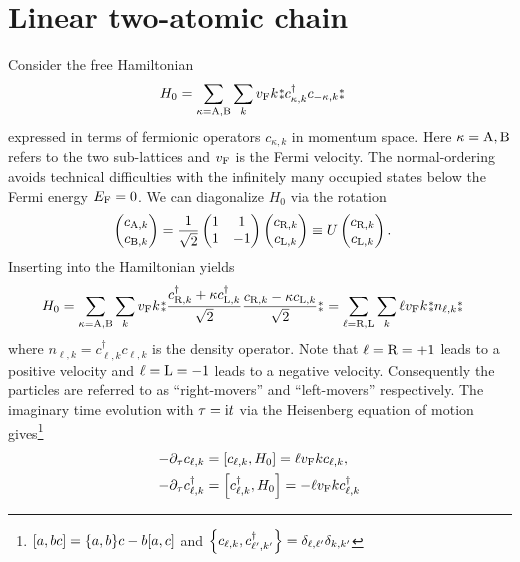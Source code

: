 \documentclass[english, parskip=full]{scrartcl}
\begin{document}
\section{Linear two-atomic chain}
Consider the free Hamiltonian
\begin{align}
H_0 &= \sum_{\kappa=\A,\B} \sum_k \vf k \varnormord{c_{\kappa,k}^\dagger c_{-\kappa,k}}
\end{align}
expressed in terms of fermionic operators $c_{\kappa,k}$ in momentum space.
Here $\kappa = \A,\B$ refers to the two sub-lattices and $\vf$ is the Fermi velocity.
The normal-ordering avoids technical difficulties with the infinitely many occupied states below the Fermi energy $E_\F=0$.
We can diagonalize $H_0$ via the rotation
\begin{align}
\begin{pmatrix}
c_{\A,k} \\ c_{\B,k}
\end{pmatrix} &= \frac{1}{\sqrt{2}} \begin{pmatrix}
1 & 1 \\ 1 & -1
\end{pmatrix} \begin{pmatrix}
c_{\R,k} \\ c_{\L,k}
\end{pmatrix} \equiv U \begin{pmatrix}
c_{\R,k} \\ c_{\L,k}
\end{pmatrix}.
\end{align}
Inserting into the Hamiltonian yields
\begin{align}
H_0 &= \sum_{\kappa=\A,\B} \sum_k \vf k \varnormord{\frac{c_{\R,k}^\dagger + \kappa c_{\L,k}^\dagger}{\sqrt{2}} \frac{c_{\R,k} - \kappa c_{\L,k}}{\sqrt{2}}} = \sum_{\ell=\R,\L} \sum_k \ell\vf k \varnormord{n_{\ell,k}}
\end{align}
where $n_{\ell,k} = c_{\ell,k}^\dagger c_{\ell,k}$ is the density operator.
Note that $\ell=\R=+1$ leads to a positive velocity and $\ell=\L=-1$ leads to a negative velocity.
Consequently the particles are referred to as ``right-movers'' and ``left-movers'' respectively.
The imaginary time evolution with $\tau=\i t$ via the Heisenberg equation of motion gives\footnote{$\klb*{a,bc} = \klc*{a,b}c - b\klb*{a,c}$ and $\klc*{c_{\ell,k}, c_{\ell',k'}^\dagger} = \delta_{\ell,\ell'} \delta_{k,k'}$}
\begin{align}
-\partial_\tau c_{\ell,k} &= \klb*{c_{\ell,k}, H_0} = \ell \vf k c_{\ell,k},\\
-\partial_\tau c_{\ell,k}^\dagger &= \klb*{c_{\ell,k}^\dagger, H_0} = -\ell \vf k c_{\ell,k}^\dagger
\end{align}
\end{document}
